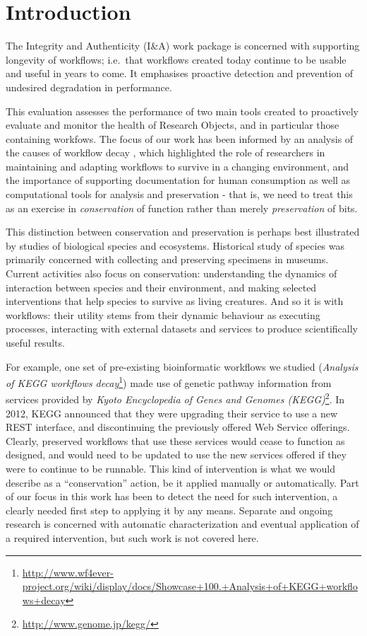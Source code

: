 \section{Introduction}

The Integrity and Authenticity (I\&A) work package is concerned with
supporting longevity of workflows; i.e.~that workflows created today
continue to be usable and useful in years to come. It emphasises
proactive detection and prevention of undesired degradation in
performance.

This evaluation assesses the performance of two main tools created to
proactively evaluate and monitor the health of Research Objects, and in
particular those containing workfows. The focus of our work has been
informed by an analysis of the causes of workflow decay
\cite{Zhao-2012}, which highlighted the role of researchers in
maintaining and adapting workflows to survive in a changing environment,
and the importance of supporting documentation for human consumption as
well as computational tools for analysis and preservation - that is, we
need to treat this as an exercise in \emph{conservation} of function
rather than merely \emph{preservation} of bits.

This distinction between conservation and preservation is perhaps best
illustrated by studies of biological species and ecosystems. Historical
study of species was primarily concerned with collecting and preserving
specimens in museums. Current activities also focus on conservation:
understanding the dynamics of interaction between species and their
environment, and making selected interventions that help species to
survive as living creatures. And so it is with workflows: their utility
stems from their dynamic behaviour as executing processes, interacting
with external datasets and services to produce scientifically useful
results.

For example, one set of pre-existing bioinformatic workflows we studied
(\emph{Analysis of KEGG workflows decay}\footnote{\url{http://www.wf4ever-project.org/wiki/display/docs/Showcase+100.+Analysis+of+KEGG+workflows+decay}})
made use of genetic pathway information from services provided by
\emph{Kyoto Encyclopedia of Genes and Genomes (KEGG)}\footnote{\url{http://www.genome.jp/kegg/}}.
In 2012, KEGG announced that they were upgrading their service to use a
new REST interface, and discontinuing the previously offered Web Service
offerings. Clearly, preserved workflows that use these services would
cease to function as designed, and would need to be updated to use the
new services offered if they were to continue to be runnable. This kind
of intervention is what we would describe as a ``conservation'' action,
be it applied manually or automatically. Part of our focus in this work
has been to detect the need for such intervention, a clearly needed
first step to applying it by any means. Separate and ongoing research
\cite{Garijo-2012} is concerned with automatic characterization and
eventual application of a required intervention, but such work is not
covered here.

